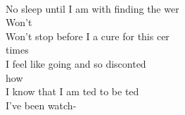   \\
\songwordfb{} No sleep until I am  with finding the wer \\
Won't  \\
\songwordfb{} Won't stop before I  a cure for this cer \\
times \\
\songwordfb{} I feel like going  and so disconted \\
how \\
\songwordfb{} I know that I am ted to be ted \\
I've been watch-
